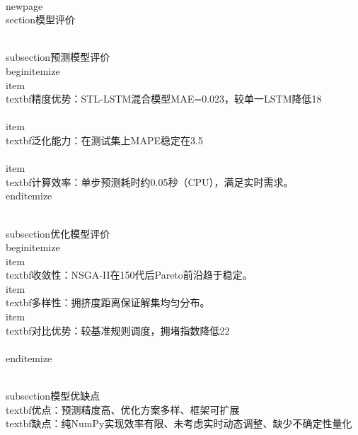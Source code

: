 \\newpage
\\section{模型评价}

\\subsection{预测模型评价}
\\begin{itemize}
    \\item \\textbf{精度优势}：STL-LSTM混合模型MAE=0.023，较单一LSTM降低18\\%
    \\item \\textbf{泛化能力}：在测试集上MAPE稳定在3.5\\%
    \\item \\textbf{计算效率}：单步预测耗时约0.05秒（CPU），满足实时需求。
\\end{itemize}

\\subsection{优化模型评价}
\\begin{itemize}
    \\item \\textbf{收敛性}：NSGA-II在150代后Pareto前沿趋于稳定。
    \\item \\textbf{多样性}：拥挤度距离保证解集均匀分布。
    \\item \\textbf{对比优势}：较基准规则调度，拥堵指数降低22\\%
\\end{itemize}

\\subsection{模型优缺点}
\\textbf{优点}：预测精度高、优化方案多样、框架可扩展
\\textbf{缺点}：纯NumPy实现效率有限、未考虑实时动态调整、缺少不确定性量化
